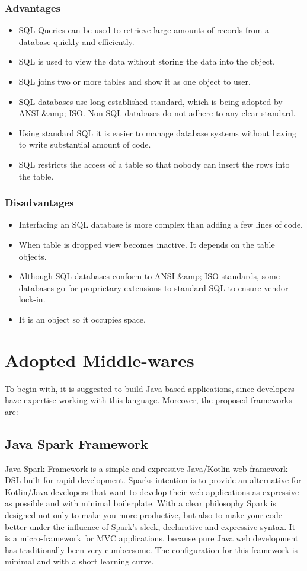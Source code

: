 \documentclass[a4paper, hidelinks, 12pt]{report}
\begin{document}
\subsubsection{Advantages}
\begin{itemize}
	\item{} SQL Queries can be used to retrieve large amounts of records from a database quickly and efficiently.
\item{} SQL is used to view the data without storing the data into the object.
\item{} SQL joins two or more tables and show it as one object to user.
\item{} SQL databases use long-established standard, which is being adopted by ANSI \&amp; ISO. Non-SQL databases do not adhere to any clear standard.
\item{} Using standard SQL it is easier to manage database systems without having to write substantial amount of code.
\item{} SQL restricts the access of a table so that nobody can insert the rows into the table.
	\end{itemize}
\subsubsection{Disadvantages}
	\begin{itemize}
	\item{} Interfacing an SQL database is more complex than adding a few lines of code.
\item{} When table is dropped view becomes inactive. It depends on the table objects.
\item{} Although SQL databases conform to ANSI \&amp; ISO standards, some databases go for proprietary extensions to standard SQL to ensure vendor lock-in.
\item{} It is an object so it occupies space.
	\end{itemize} 

	\section{Adopted Middle-wares}
	To begin with, it is suggested to build Java based applications, since developers have expertise working with this language. Moreover, the proposed frameworks are:
\subsection{Java Spark Framework} Java Spark Framework is a simple and expressive Java/Kotlin web framework DSL built for rapid development. Sparks intention is to provide an alternative for Kotlin/Java developers that want to develop their web applications as expressive as possible and with minimal boilerplate. With a clear philosophy Spark is designed not only to make you more productive, but also to make your code better under the influence of Spark’s sleek, declarative and expressive syntax. It is a micro-framework for MVC applications, because pure Java web development has traditionally been very cumbersome. The configuration for this framework is minimal and with a short learning curve.
\end{document}
